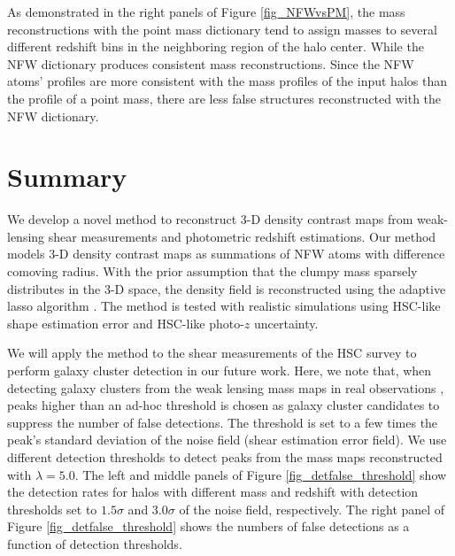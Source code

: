 \documentclass[twocolumn]{aastex62}
\begin{document}
As demonstrated in the right panels of Figure \ref{fig_NFWvsPM}, the mass
reconstructions with the point mass dictionary tend to assign masses to
several different redshift bins in the neighboring region of the halo center.
While the NFW dictionary produces consistent mass reconstructions.
Since the NFW atoms' profiles are more consistent with the mass profiles of the
input halos than the profile of a point mass, there are less false structures
reconstructed with the NFW dictionary.

\section{Summary}
\label{sec:Sum}

We develop a novel method to reconstruct $3$-D density contrast maps from
weak-lensing shear measurements and photometric redshift estimations.  Our
method models $3$-D density contrast maps as summations of NFW atoms with
difference comoving radius.  With the prior assumption that the clumpy mass
sparsely distributes in the $3$-D space, the density field is reconstructed
using the adaptive lasso algorithm \citep{AdaLASSO-Zou2006}. The method is
tested with realistic simulations using HSC-like shape estimation error and
HSC-like photo-$z$ uncertainty.

We will apply the method to the shear measurements of the HSC survey
\citep{HSC1-catalog,FPFSHSC1-Li2020} to perform galaxy cluster detection in our
future work.  Here, we note that, when detecting galaxy clusters from the weak
lensing mass maps in real observations \citep{HSC1-massMap-cluster}, peaks
higher than an ad-hoc threshold is chosen as galaxy cluster candidates to
suppress the number of false detections. The threshold is set to a few times
the peak's standard deviation of the noise field (shear estimation error
field). We use different detection thresholds to detect peaks from the mass
maps reconstructed with $\lambda=5.0$. The left and middle panels of Figure
\ref{fig_detfalse_threshold} show the detection rates for halos with different
mass and redshift with detection thresholds set to $1.5\sigma$ and $3.0\sigma$
of the noise field, respectively. The right panel of Figure
\ref{fig_detfalse_threshold} shows the numbers of false detections as a
function of detection thresholds.
\end{document}
